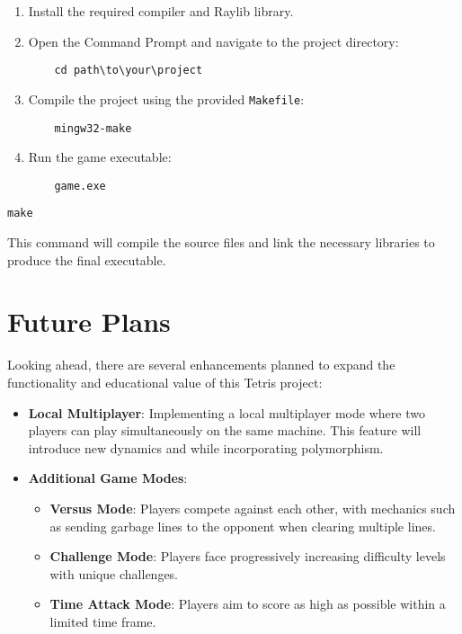 \documentclass{article}
\begin{document}
\begin{enumerate}
    \item Install the required compiler and Raylib library.
    \item Open the Command Prompt and navigate to the project directory:
    \begin{lstlisting}
    cd path\to\your\project
    \end{lstlisting}
    \item Compile the project using the provided \texttt{Makefile}:
    \begin{lstlisting}
    mingw32-make
    \end{lstlisting}
    \item Run the game executable:
    \begin{lstlisting}
    game.exe
    \end{lstlisting}
\end{enumerate}

\begin{verbatim}
make
\end{verbatim}

This command will compile the source files and link the necessary libraries to produce the final executable.

\section{Future Plans}

Looking ahead, there are several enhancements planned to expand the functionality and educational value of this Tetris project:

\begin{itemize}
    \item \textbf{Local Multiplayer}: Implementing a local multiplayer mode where two players can play simultaneously on the same machine. This feature will introduce new dynamics and while incorporating polymorphism.
    \item \textbf{Additional Game Modes}:
    \begin{itemize}
        \item \textbf{Versus Mode}: Players compete against each other, with mechanics such as sending garbage lines to the opponent when clearing multiple lines.
        \item \textbf{Challenge Mode}: Players face progressively increasing difficulty levels with unique challenges.
        \item \textbf{Time Attack Mode}: Players aim to score as high as possible within a limited time frame.
    \end{itemize}
\end{itemize}
\end{document}
